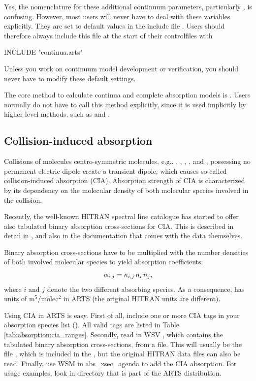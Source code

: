 Yes, the nomenclature for these additional continuum parameters,
particularly , is confusing. However,
most users will never have to deal with these variables
explicitly. They are set to default values in the include file
. Users should therefore always include this file  at
the start of their controlfiles with
\begin{code}
  INCLUDE "continua.arts"
\end{code}
Unless you work on continuum model development or verification, you
should never have to modify these default settings.

The core method to calculate continua and complete absorption models
is .  Users normally do not
have to call this method explicitly, since it is used implicitly by
higher level methods, such as  and
.

\subsection{Collision-induced absorption}
\label{sec:absorption:cia}

Collisions of molecules centro-symmetric molecules, e.g., ,
, , , and , possessing no permanent
electric dipole create a transient dipole, which causes so-called collision-induced
absorption (CIA). Absorption strength of CIA is characterized by its dependency
on the molecular density of both molecular species involved in the collision.

Recently, the well-known HITRAN spectral line catalogue has started to
offer also tabulated binary absorption cross-sections for CIA.  This is
described in detail in \citet{richard:12}, and also in the documentation that
comes with the data themselves.

Binary absorption cross-sections
 have to be multiplied with the number densities of both involved
molecular species to yield absorption coefficients:
\begin{equation}
{\alpha}_{i,j} =  {\kappa}_{i,j} \, {n}_{i} \, {n}_{j},
\end{equation}
where $i$ and $j$ denote the two different absorbing species. As a
consequence,  has units of m$^5$/molec$^2$ in ARTS (the
original HITRAN units are different).

Using CIA in ARTS is easy. First of all, include one or more CIA tags
in your absorption species list (). All valid
tags are listed in Table \ref{tab:absorption:cia_ranges}. Secondly,
read in WSV , which contains the tabulated
binary absorption cross-sections, from a file. This will usually be the
file , which is included in the
, but the original HITRAN data files can also be
read. Finally, use WSM  in
abs\_xsec\_agenda to add the CIA absorption. For usage examples, look
in directory  that is part
of the ARTS distribution.


